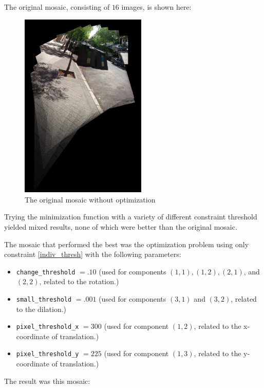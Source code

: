 \documentclass{article}
\begin{document}
The original mosaic, consisting of $16$ images, is shown here: 

\begin{figure}[h!]
\centering
\includegraphics[width=6cm]{test_set_16/regmos0016_edit.jpg}
\caption{The original mosaic without optimization}
\end{figure}

Trying the minimization function with a variety of different constraint
threshold yielded mixed results, none of which were better than the original
mosaic.

The mosaic that performed the best was the optimization problem using only
constraint \ref{indiv_thresh} with the following parameters:

\begin{itemize}

\item \verb|change_threshold| $=.10$ (used for components $(1, 1), (1, 2), (2, 1)$, and $(2, 2)$, related to the rotation.)

\item \verb|small_threshold| $=.001$ (used for components $(3, 1)$ and $(3, 2)$, related to the dilation.)

\item \verb|pixel_threshold_x| $= 300$ (used for component $(1, 2)$, related to the x-coordinate of translation.)

\item \verb|pixel_threshold_y| $= 225$ (used for component $(1, 3)$, related to the y-coordinate of translation.)

\end{itemize}  

The result was this mosaic:
\end{document}
